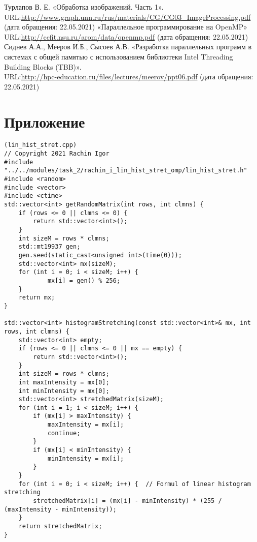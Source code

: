 \documentclass{report}
\begin{document}
\begin{thebibliography}{1}
 Турлапов В. Е. «Обработка изображений. Часть 1».
\\URL:\url {http://www.graph.unn.ru/rus/materials/CG/CG03_ImageProcessing.pdf} (дата обращения: 22.05.2021)
\bibitem{} «Параллельное программирование на OpenMP»
\\URL:\url {http://ccfit.nsu.ru/arom/data/openmp.pdf} (дата обращения: 22.05.2021)
 Сиднев А.А., Мееров И.Б., Сысоев А.В. «Разработка параллельных программ в системах с общей памятью с использованием библиотеки Intel Threading Building Blocks (TBB)».
\\URL:\url {http://hpc-education.ru/files/lectures/meerov/ppt06.pdf} (дата обращения: 22.05.2021)
\newpage

\section*{Приложение}
\begin{lstlisting}
(lin_hist_stret.cpp)
// Copyright 2021 Rachin Igor
#include "../../modules/task_2/rachin_i_lin_hist_stret_omp/lin_hist_stret.h"
#include <random>
#include <vector>
#include <ctime>
std::vector<int> getRandomMatrix(int rows, int clmns) {
    if (rows <= 0 || clmns <= 0) {
        return std::vector<int>();
    }
    int sizeM = rows * clmns;
    std::mt19937 gen;
    gen.seed(static_cast<unsigned int>(time(0)));
    std::vector<int> mx(sizeM);
    for (int i = 0; i < sizeM; i++) {
            mx[i] = gen() % 256;
    }
    return mx;
}

std::vector<int> histogramStretching(const std::vector<int>& mx, int rows, int clmns) {
    std::vector<int> empty;
    if (rows <= 0 || clmns <= 0 || mx == empty) {
        return std::vector<int>();
    }
    int sizeM = rows * clmns;
    int maxIntensity = mx[0];
    int minIntensity = mx[0];
    std::vector<int> stretchedMatrix(sizeM);
    for (int i = 1; i < sizeM; i++) {
        if (mx[i] > maxIntensity) {
            maxIntensity = mx[i];
            continue;
        }
        if (mx[i] < minIntensity) {
            minIntensity = mx[i];
        }
    }
    for (int i = 0; i < sizeM; i++) {  // Formul of linear histogram stretching
        stretchedMatrix[i] = (mx[i] - minIntensity) * (255 / (maxIntensity - minIntensity));
    }
    return stretchedMatrix;
}


\end{lstlisting}
\end{thebibliography}
\end{document}
